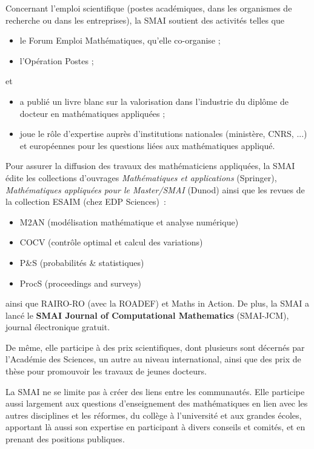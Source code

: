 Concernant l'emploi scientifique (postes acad\'emiques, dans les organismes de recherche ou dans les entreprises), la SMAI soutient des activit\'es
telles que
\begin{itemize}%
    \item le Forum Emploi Math\'ematiques, qu'elle co-organise ;
    \item l'Op\'eration Postes ;
\end{itemize}
et
\begin{itemize}%
    \item a publi\'e un \og livre blanc sur la valorisation dans l'industrie du dipl\^ome de docteur en math\'ematiques appliqu\'ees\fg{} ;
    \item joue le r\^ole d'expertise aupr\`es d'institutions
	nationales (minist\`ere, CNRS, ...) et europ\'eennes
	pour les questions li\'ees aux math\'ematiques appliqu\'e.
\end{itemize}

Pour assurer la diffusion des travaux des math\'ematiciens
appliqu\'ees, la SMAI \'edite les collections d'ouvrages
\emph{Math\'ematiques et applications} (Springer), \emph{Math\'ematiques appliqu\'ees
pour le Master/SMAI} (Dunod) ainsi que les revues de la collection
ESAIM (chez EDP Sciences)~: 
	\begin{itemize}
		\item M2AN (mod\'elisation math\'ematique et analyse num\'erique)
		\item COCV (contr\^ole optimal et calcul des variations)
		\item P\&S (probabilit\'es \& statistiques)
		\item ProcS (proceedings and surveys)
	\end{itemize}
ainsi que RAIRO-RO (avec la ROADEF) et Maths in Action. De plus, la SMAI a lanc\'e le \textbf{SMAI Journal of Computational Mathematics}
(SMAI-JCM), journal \'electronique gratuit.

De m\^eme, elle participe \`a des prix scientifiques,
dont plusieurs sont d\'ecern\'es par l'Acad\'emie des Sciences,
un autre au niveau international, ainsi que des prix
de th\`ese pour promouvoir les travaux de jeunes docteurs.

La SMAI ne se limite pas \`a cr\'eer
des liens entre les communaut\'es. Elle participe aussi largement aux questions
d'enseignement des math\'ematiques en lien avec les autres disciplines et les r\'eformes, du coll\`ege \`a l'universit\'e
et aux grandes \'ecoles,
apportant l\`a aussi son expertise en
participant \`a divers conseils et comit\'es, et en prenant
des positions publiques.

